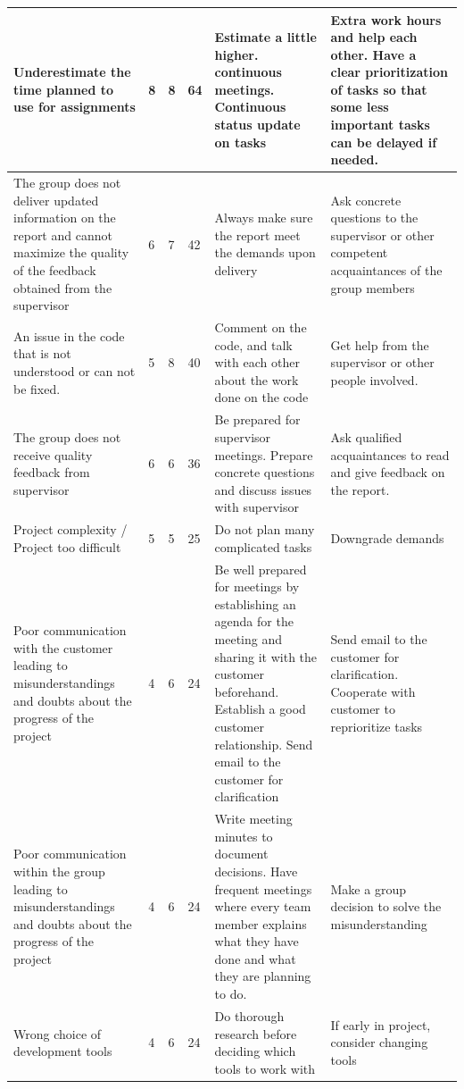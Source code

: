 \begin{appendices}
\begin{longtable}{ | p{3.5cm} | p{2cm} | p{1.5cm} | p{2cm} | p{3.5cm} | p{3.5cm} |}
	
	Underestimate the time planned to use for assignments & 8 & 8 & 64 & Estimate a little higher. continuous meetings. Continuous status update on tasks & Extra work hours and help each other. Have a clear prioritization of tasks so that some less important tasks can be delayed if needed. \\ \hline
	
	The group does not deliver updated information on the report and cannot maximize the quality of the feedback obtained from the supervisor & 6 & 7 & 42 & Always make sure the report meet the demands upon delivery & Ask concrete questions to the supervisor or other competent acquaintances of the group members \\ \hline
	
	An issue in the code that is not understood or can not be fixed. & 5 & 8 & 40 & Comment on the code, and talk with each other about the work done on the code & Get help from the supervisor or other people involved. \\ \hline
	
	The group does not receive quality feedback from supervisor & 6 & 6 & 36 & Be prepared for supervisor meetings. Prepare concrete questions and discuss issues with supervisor & Ask qualified acquaintances to read and give feedback on the report.  \\ \hline
	
	Project complexity / Project too difficult & 5 & 5 & 25 & Do not plan many complicated tasks & Downgrade demands \\ \hline
	
	Poor communication with the customer leading to misunderstandings and doubts about the progress of the project & 4 & 6 & 24 & Be well prepared for meetings by establishing an agenda for the meeting and sharing it with the customer beforehand. Establish a good customer relationship. Send email to the customer for clarification & Send email to the customer for clarification. Cooperate with customer to reprioritize tasks \\ \hline
	
	Poor communication within the group leading to misunderstandings and doubts about the progress of the project & 4 & 6 & 24 & Write meeting minutes to document decisions. Have frequent meetings where every team member explains what they have done and what they are planning to do. & Make a group decision to solve the misunderstanding \\ \hline
	
	Wrong choice of development tools & 4 & 6 & 24 & Do thorough research before deciding which tools to work with & If early in project, consider changing tools \\ \hline
	

\end{longtable}
\end{appendices}
